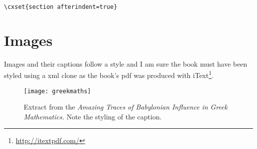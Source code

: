\begin{verbatim}
\cxset{section afterindent=true}
\end{verbatim}

\section{Images}
\indent Images and their captions follow a \latexe style and I am sure the book must have been styled using a \latexe xml clone as the book's pdf was produced with iText\footnote{\url{http://itextpdf.com/}}.

\begin{figure}[ht]
\centering
\texttt{[image: greekmaths]}
\caption{Extract from the \textit{Amazing Traces of Babylonian Influence in Greek Mathematics.} Note the styling of the caption.}
\end{figure}

\testsections


